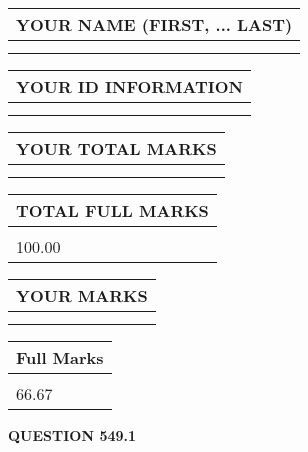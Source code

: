 \documentclass{ctexart}
\begin{document}
   
   
   
\newpage 
\setcounter{page}{ 
   549001 } 
   
   
   
   
\noindent\begin{tabular}{|l|}
\hline
YOUR NAME (FIRST, ... LAST)  \\
\hline
 \\ 
 \\ 
\hline
\end{tabular}
\hspace{0.05in} \begin{tabular}{|l|}
\hline
 YOUR   ID   INFORMATION  \\
\hline
 \\ 
 \\ 
\hline
\end{tabular}
   
   
\vspace{0.2in}\noindent\begin{tabular}{|l|}
\hline
YOUR TOTAL MARKS  \\
\hline
 \\ 
 \\ 
\hline
\end{tabular}
\hspace{0.05in} \begin{tabular}{|l|}
\hline
TOTAL FULL MARKS  \\
\hline
 \\ 
100.00 \\
\hline
\end{tabular}
   
   
 \vspace{0.2in}
 
 
 
 
   
   
  
\vspace{0.2in}
  
\noindent\begin{tabular}{|l|}
\hline
 YOUR MARKS  \\
\hline
 \\ 
 \\ 
\hline
\end{tabular}
\hspace{0.05in} \begin{tabular}{|l|}
\hline
 Full Marks  \\
\hline
 \\ 
66.67 \\
\hline
\end{tabular}
{\textbf{\Large{QUESTION
549.1 
}}}
  
\end{document}
